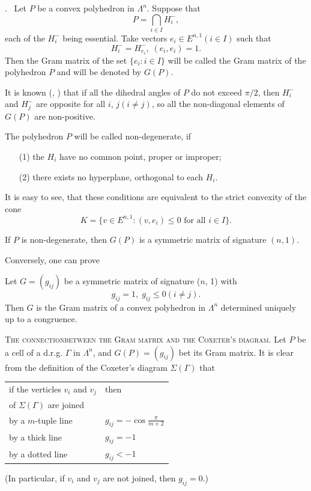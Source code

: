 .~ Let $P$ be a convex polyhedron in $\Lambda^n$. Suppose that 
\begin{equation}
P = \bigcap\limits_{i \in I} H^-_i,  \label{art10-eq2.5}
\end{equation}
each of the $H^-_i$ being essential. Take vectors $e_i \in E^{n,1} (i\in I)$ such that 
$$
H^-_i = H^-_{e_i}, \; (e_i, e_i) = 1.
$$
Then the Gram matrix of the set $\{e_i : i \in I\}$ will be called the Gram matrix of the polyhedron $P$ and will be denoted by $G(P)$.

It is known (\cite{art10-key9}, \cite{art10-key12}) that if all the dihedral angles of $P$ do not exceed $\pi/2$, then $H^-_i$ and $H^-_j$ are opposite for all $i$, $j (i \neq j)$, so all the non-diagonal elements of $G(P)$ are non-positive.

The polyhedron $P$ will be called non-degenerate, if 
\begin{itemize}
\item[(1)] the $H_i$ have no common point, proper or improper;

\item[(2)] there exists no hyperplane, orthogonal to each $H_i$.
\end{itemize}

It is easy to see, that these conditions are equivalent to the strict convexity of the cone
$$
K = \{v \in E^{n,1}: (v, e_i) \leqslant 0 \text{ for all } i \in I\}.
$$

If $P$ is non-degenerate, then $G(P)$ is a symmetric matrix of signature $(n,1)$.

Conversely, one can prove 

\setcounter{theorem}{1}
\begin{theorem}\label{art10-thm2.2}
Let $G = (g_{ij})$ be a symmetric matrix of signature ($n$, 1) with 
$$
g_{ij} = 1, \; g_{ij} \leqslant 0 (i \neq j).
$$
Then $G$ is the Gram matrix of a convex polyhedron in $\Lambda^n$ determined uniquely up to a congruence.
\end{theorem}

\textsc{The connection\pageoriginale  between the Gram matrix and the Coxeter's diagram.} Let $P$ be a cell of a d.r.g. $\Gamma$ in $\Lambda^n$, and $G(P) = (g_{ij})$ bet its Gram matrix. It is clear from the definition of the Coxeter's diagram $\Sigma (\Gamma)$ that
\begin{center}
\begin{tabular}{l|l}
if the verticles $v_i $ and $v_j$ & \qquad then \\
of $\Sigma (\Gamma)$ are joined & \\\hline
by a $m$-tuple line & $g_{ij} = - \cos \frac{\pi}{m +2}$\\[0.1cm]
by a thick line & $g_{ij} = - 1$\\[0.1cm]
by a dotted line & $g_{ij} < -1$
\end{tabular}
\end{center}
(In particular, if $v_i$ and $v_j$ are not joined, then $g_{ij} = 0$.)

